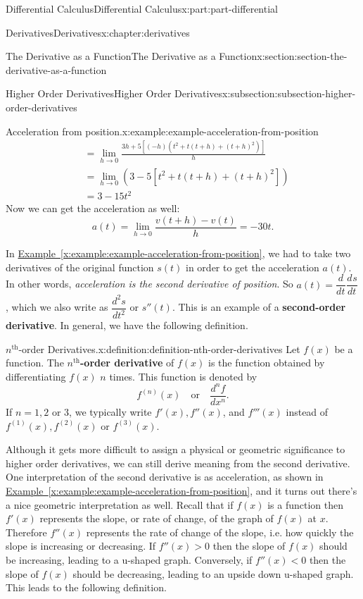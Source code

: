 \documentclass[twoside,10pt,]{book}
\newcommand{\xreffont}{\relax}
\newcommand{\terminology}[1]{\textbf{#1}}
\numberwithin{equation}{part}
\newcommand{\dv}[3][]{\dfrac{d^{#1} #2}{d #3^{#1}}}
\begin{document}
\begin{partptx}{Differential Calculus}{}{Differential Calculus}{}{}{x:part:part-differential}
\begin{chapterptx}{Derivatives}{}{Derivatives}{}{}{x:chapter:derivatives}
\begin{sectionptx}{The Derivative as a Function}{}{The Derivative as a Function}{}{}{x:section:section-the-derivative-as-a-function}
\begin{subsectionptx}{Higher Order Derivatives}{}{Higher Order Derivatives}{}{}{x:subsection:subsection-higher-order-derivatives}
\begin{example}{Acceleration from position.}{x:example:example-acceleration-from-position}
\begin{align*}
& = \lim_{h\to0}\frac{3h + 5[(-h)(t^{2} + t(t+h) + (t+h)^{2})]}{h} \\
& = \lim_{h\to0}(3 - 5[t^{2} + t(t+h) + (t+h)^{2}]) \\
& = 3 - 15t^{2} 
\end{align*}
Now we can get the acceleration as well:%
\begin{equation*}
a(t) = \lim_{h\to0}\frac{v(t+h) - v(t)}{h} = -30t.
\end{equation*}
%
\end{example}
In \hyperref[x:example:example-acceleration-from-position]{Example~{\xreffont\ref{x:example:example-acceleration-from-position}}}, we had to take two derivatives of the original function \(s(t)\) in order to get the acceleration \(a(t)\). In other words, \emph{acceleration is the second derivative of position}. So \(a(t) = \dv{}{t}\dv{s}{t}\), which we also write as \(\dv[2]{s}{t}\) or \(s''(t)\). This is an example of a \terminology{second-order derivative}. In general, we have the following definition.%
\begin{definition}{\(n^{\text{th}}\)-order Derivatives.}{x:definition:definition-nth-order-derivatives}%
%
Let \(f(x)\) be a function. The \terminology{\(n^{\text{th}}\)-order derivative} of \(f(x)\) is the function obtained by differentiating \(f(x)\) \(n\) times. This function is denoted by%
\begin{equation*}
f^{(n)}(x)\quad\text{or}\quad\dv[n]{f}{x}.
\end{equation*}
If \(n=1, 2\) or \(3\), we typically write \(f'(x), f''(x)\), and \(f'''(x)\) instead of \(f^{(1)}(x), f^{(2)}(x)\) or \(f^{(3)}(x)\).%
\end{definition}
Although it gets more difficult to assign a physical or geometric significance to higher order derivatives, we can still derive meaning from the second derivative. One interpretation of the second derivative is as acceleration, as shown in \hyperref[x:example:example-acceleration-from-position]{Example~{\xreffont\ref{x:example:example-acceleration-from-position}}}, and it turns out there's a nice geometric interpretation as well. Recall that if \(f(x)\) is a function then \(f'(x)\) represents the slope, or rate of change, of the graph of \(f(x)\) at \(x\). Therefore \(f''(x)\) represents the rate of change of the slope, i.e. how quickly the slope is increasing or decreasing. If \(f''(x) >0\) then the slope of \(f(x)\) should be increasing, leading to a u-shaped graph. Conversely, if \(f''(x) <0\) then the slope of \(f(x)\) should be decreasing, leading to an upside down u-shaped graph. This leads to the following definition.%

\end{subsectionptx}
\end{sectionptx}
\end{chapterptx}
\end{partptx}
\end{document}
